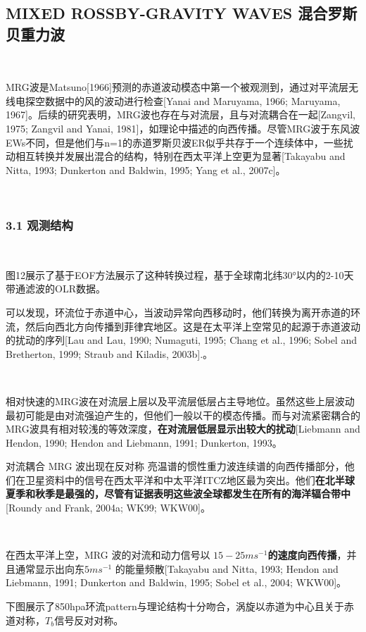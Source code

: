 \documentclass{article}
\begin{document}
\begin{CJK*}{UTF8}{gbsn}
\subsection*{ MIXED ROSSBY-GRAVITY WAVES 混合罗斯贝重力波}

\ 

MRG波是Matsuno[1966]预测的赤道波动模态中第一个被观测到，通过对平流层无线电探空数据中的风的波动进行检查[Yanai and Maruyama, 1966; Maruyama, 1967]。后续的研究表明，MRG波也存在与对流层，且与对流耦合在一起[Zangvil, 1975; Zangvil and Yanai, 1981]，如理论中描述的向西传播。尽管MRG波于东风波EWs不同，但是他们与n=1的赤道罗斯贝波ER似乎共存于一个连续体中，一些扰动相互转换并发展出混合的结构，特别在西太平洋上空更为显著[Takayabu and Nitta, 1993; Dunkerton and Baldwin, 1995; Yang et al., 2007c]。

\ 

\subsubsection*{ 3.1 观测结构}


\ 

图12展示了基于EOF方法展示了这种转换过程，基于全球南北纬30°以内的2-10天带通滤波的OLR数据。

可以发现，环流位于赤道中心，当波动异常向西移动时，他们转换为离开赤道的环流，然后向西北方向传播到菲律宾地区。这是在太平洋上空常见的起源于赤道波动的扰动的序列[Lau and Lau, 1990; Numaguti, 1995; Chang et al., 1996; Sobel and Bretherton, 1999; Straub and Kiladis, 2003b].。


\ 

相对快速的MRG波在对流层上层以及平流层低层占主导地位。虽然这些上层波动最初可能是由对流强迫产生的，但他们一般以干的模态传播。而与对流紧密耦合的MRG波具有相对较浅的等效深度，\textbf{在对流层低层显示出较大的扰动}[Liebmann and Hendon, 1990; Hendon and Liebmann, 1991; Dunkerton, 1993。 

对流耦合 MRG 波出现在反对称 亮温谱的惯性重力波连续谱的向西传播部分，他们在卫星资料中的信号在西太平洋和中太平洋ITCZ地区最为突出。他们\textbf{在北半球夏季和秋季是最强的，尽管有证据表明这些波全球都发生在所有的海洋辐合带中}[Roundy and Frank, 2004a; WK99; WKW00]。

\ 

在西太平洋上空，MRG 波的对流和动力信号以\textbf{ $15-25 m s^{-1}$的速度向西传播}，并且通常显示出向东$5 m s^{-1}$ 的能量频散[Takayabu and Nitta, 1993; Hendon and Liebmann, 1991; Dunkerton and Baldwin, 1995; Sobel et al., 2004; WKW00]。


下图展示了850hpa环流pattern与理论结构十分吻合，涡旋以赤道为中心且关于赤道对称，$T_b$信号反对对称。


\end{CJK*}
\end{document}
